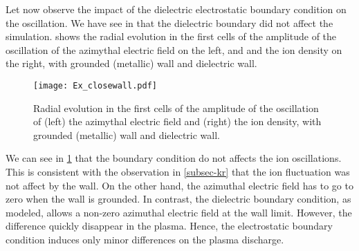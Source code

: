   Let now observe the impact of the dielectric electrostatic boundary condition on the oscillation.
  We have see in  that the dielectric boundary did not affect the simulation.
   shows the radial evolution in the first cells of the amplitude of the oscillation of the azimythal electric field on the left, and and the ion density on the right, with grounded (metallic) wall and dielectric wall.
  
  \begin{figure}[hbtp]
    \centering
    \texttt{[image: Ex\_closewall.pdf]}
    \caption{Radial evolution in the first cells of the amplitude of the oscillation of (left) the azimythal electric field and (right) the ion density, with grounded (metallic) wall and dielectric wall.}
    \label{fig-closswallosci}
  \end{figure}
  
  We can see in \cref{fig-closswallosci} that the boundary condition do not affects the ion oscillations.
  This is consistent with the observation in \cref{subsec-kr} that the ion fluctuation was not affect by the wall.
  On the other hand, the azimuthal electric field has to go to zero when the wall is grounded.
  In contrast, the dielectric boundary condition, as modeled, allows a non-zero azimuthal electric field at the wall limit.
  However, the difference quickly disappear in the plasma.
  Hence, the electrostatic boundary condition induces only minor differences on the plasma discharge.
  
  